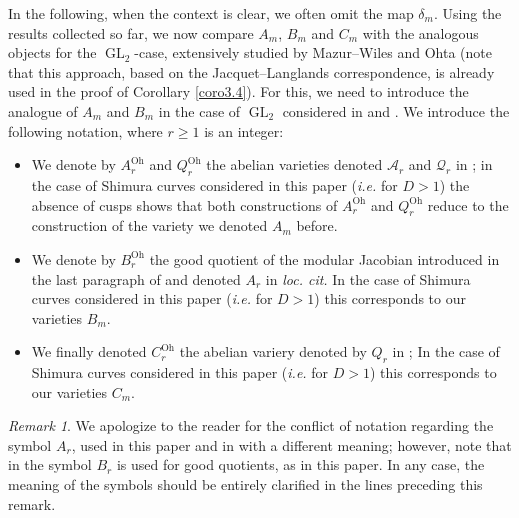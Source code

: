 \documentclass[a4paper,11pt]{amsart}
\numberwithin{equation}{section}
\theoremstyle{plain}
\theoremstyle{definition}
\theoremstyle{remark}
\newtheorem{remark}[theorem]{Remark}
\DeclareMathOperator{\GL}{GL}
\newcommand{\Oh}{\mathrm{Oh}}
\begin{document}
In the following, when the context is clear, we often omit the map $\delta_m$. Using the results collected so far, we now compare $A_m$, $B_m$ and $C_m$ with the analogous objects for the $\GL_2$-case, extensively studied by Mazur--Wiles \cite{MW} and Ohta \cite{OhtaJ, Ohta-ES, OhtaC, OhtaMA} (note that this approach, based on the Jacquet--Langlands correspondence, is already used in the proof of Corollary \ref{coro3.4}). For this, we need to introduce the analogue of $A_m$ and $B_m$ in the case of $\GL_2$ considered in \cite[\S1.1]{OhtaMA} and
\cite[\S4.1]{OhtaC}. We introduce the following notation, where $r\geq 1$ is an integer: 
\begin{itemize}
    \item We denote by $A_r^\Oh$ and $Q_r^\Oh$ the abelian varieties denoted $\mathcal{A}_r$ and $\mathcal{Q}_r$ in \cite[\S1.1]{OhtaMA}; in the case of Shimura curves considered in this paper (\emph{i.e.} for $D>1$) the absence of cusps shows that both constructions of $A_r^\Oh $ and $Q_r^\Oh $ reduce to the construction of the variety we denoted $A_m$ before. 
    \item We denote by $B_r^\Oh $ the good quotient of the modular Jacobian introduced in the last paragraph of \cite[\S1.1]{OhtaMA} and denoted $A_r$ in \emph{loc. cit.} In the case of Shimura curves considered in this paper (\emph{i.e.} for $D>1$) this corresponds to our varieties $B_m$.  
    \item We finally denoted $C_r^\Oh$ the abelian variery denoted by $Q_r$ in \cite[\S4.1]{OhtaC}; In the case of Shimura curves considered in this paper (\emph{i.e.} for $D>1$) this corresponds to our varieties $C_m$.  
\end{itemize} 
\begin{remark} We apologize to the reader for the conflict of notation regarding the symbol $A_r$, used in this paper and in \cite[\S1.1]{OhtaMA} with a different meaning; however, note that in \cite[\S4.1]{OhtaC} the symbol $B_r$ is used for good quotients, as in this paper. 
In any case, the meaning of the symbols should be entirely clarified in the lines preceding this remark.
\end{remark}
\end{document}
